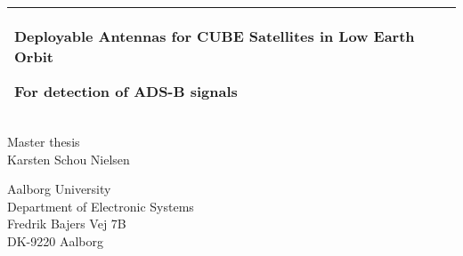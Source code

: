 %
%
%
%
%
\begin{titlepage}
  \addtolength{\hoffset}{0.5\evensidemargin-0.5\oddsidemargin} %
  \noindent%
  \begin{tabular}{@{}p{\textwidth}@{}}
    \toprule[2pt]
    \midrule
    \vspace{0.2cm}
    \begin{center}
    \Huge{\textbf{
      Deployable Antennas for CUBE Satellites in Low Earth Orbit %
    }}
    \end{center}
    \begin{center}
      \Large{
        For detection of ADS-B signals %
      }
    \end{center}
    \vspace{0.2cm}\\
    \midrule
    \toprule[2pt]
  \end{tabular}
  \vspace{4 cm}
  \begin{center}
    {\large
      Master thesis%
    }\\
    \vspace{0.2cm}
    {\Large
      Karsten Schou Nielsen%
    }
  \end{center}
  \vfill
  \begin{center}
  Aalborg University\\
  Department of Electronic Systems\\
  Fredrik Bajers Vej 7B\\
  DK-9220 Aalborg
  \end{center}
\end{titlepage}
\clearpage
